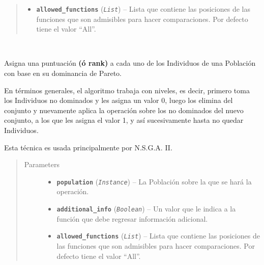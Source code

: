 \documentclass[letterpaper,10pt,english]{sphinxmanual}
\begin{document}
\begin{fulllineitems}
\begin{fulllineitems}
\begin{quote}
\begin{description}
\begin{itemize}
\item {} 
\textbf{\texttt{allowed\_functions}} (\emph{\texttt{List}}) -- Lista que contiene las posiciones de las funciones que son admisibles 
para hacer comparaciones. Por defecto tiene el valor ``All''.

\end{itemize}

\end{description}\end{quote}

\end{fulllineitems}


\begin{fulllineitems}
\label{Model/Community/Community:Model.Community.Community.Community.assign_goldberg_pareto_rank}~
\begin{DUlineblock}{0em}
\item[] Asigna una puntuación \textbf{(ó rank)} a cada uno de los Individuos de una Población con base en su dominancia
de Pareto.
\item[] En términos generales, el algoritmo trabaja con niveles, es decir, primero toma los Individuos no
dominados y les asigna un valor 0, luego los elimina del conjunto y nuevamente aplica la 
operación sobre los no dominados del nuevo conjunto, a los que les asigna el valor 1, y así
sucesivamente hasta no quedar Individuos.
\item[] Esta técnica es usada principalmente por N.S.G.A. II.
\end{DUlineblock}
\begin{quote}\begin{description}
\item[{Parameters}] \leavevmode\begin{itemize}
\item {} 
\textbf{\texttt{population}} (\emph{\texttt{Instance}}) -- La Población sobre la que se hará la operación.

\item {} 
\textbf{\texttt{additional\_info}} (\emph{\texttt{Boolean}}) -- Un valor que le indica a la función que debe regresar información 
adicional.

\item {} 
\textbf{\texttt{allowed\_functions}} (\emph{\texttt{List}}) -- Lista que contiene las posiciones de las funciones que son admisibles 
para hacer comparaciones. Por defecto tiene el valor ``All''.


\end{itemize}
\end{description}
\end{quote}
\end{fulllineitems}
\end{fulllineitems}
\end{document}
